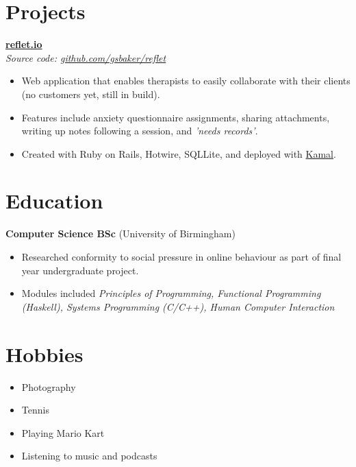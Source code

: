 \documentclass[letterpaper,11pt]{article}
\begin{document}
\section{Projects}

\textbf{\href{https://reflet.io}{reflet.io}} \\
\textit{Source code: \href{https://github.com/gsbaker/reflet}{github.com/gsbaker/reflet}} \\

\begin{itemize}[noitemsep]
\item Web application that enables therapists to easily collaborate with their clients (no customers yet, still in build).
\item Features include anxiety questionnaire assignments, sharing attachments, writing up notes following a session, and \textit{'needs records'}.
\item Created with Ruby on Rails, Hotwire, SQLLite, and deployed with \href{https://kamal-deploy.org}{Kamal}.
\end{itemize}


\section{Education}

\textbf{Computer Science BSc} (University of Birmingham) \\

\begin{itemize}[noitemsep]
\item Researched conformity to social pressure in online behaviour as part of final year undergraduate project.
\item Modules included \textit{Principles of Programming, Functional Programming (Haskell), Systems Programming (C/C++), Human Computer Interaction}
\end{itemize}

\section{Hobbies}

\begin{itemize}[noitemsep]
\item Photography
\item Tennis
\item Playing Mario Kart
\item Listening to music and podcasts
\end{itemize}

\end{document}
